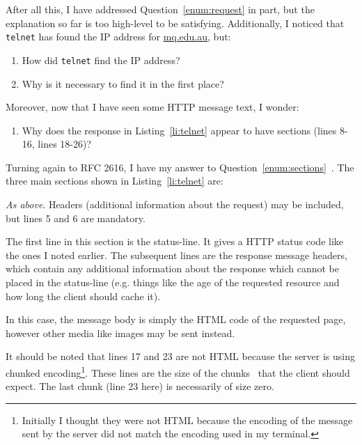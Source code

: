\documentclass[11pt,a4paper]{report}
\newcommand{\Q}[2]{
	\label{#2}
	\marginpar{\textbf{Q#1.\begin{NoHyper}\ref{#2}\end{NoHyper} }}
}
\newcounter{saveenumi}
\newcommand{\savei}{\setcounter{saveenumi}{\value{enumi}}}
\newcommand{\loadi}{\setcounter{enumi}{\value{saveenumi}}}
\begin{document}
	After all this, I have addressed Question~\ref{enum:request} in part, but the explanation so far is too high-level to be satisfying. Additionally, I noticed that \verb|telnet| has found the IP address for \url{mq.edu.au}, but:
	\begin{enumerate}
		\loadi
		\item How did \verb|telnet| find the IP address? \Q{2}{enum:howfindip}
		\item Why is it necessary to find it in the first place? \Q{2}{enum:whyfindip}
		\savei
	\end{enumerate}
	Moreover, now that I have seen some HTTP message text, I wonder:
	\begin{enumerate}
		\loadi
		\item Why does the response in Listing~\ref{li:telnet} appear to have sections (lines 8-16, lines 18-26)? \Q{2}{enum:sections}
		\savei
	\end{enumerate}
	
	Turning again to RFC 2616, I have my answer to Question~\ref{enum:sections}~\cite[Section~4]{http-rfc}. The three main sections shown in Listing~\ref{li:telnet} are:

	\begin{description}
		\setlength{}
		\item[Request {\rm (lines 5-7)}] \textit{As above}. Headers (additional information about the request) may be included, but lines 5 and 6 are mandatory.
		\item[Status-line {\rm and} response message headers {\rm (lines 8-16)}] The first line in this section is the status-line. It gives a HTTP status code like the ones I noted earlier. The subsequent lines are the response message headers, which contain any additional information about the response which cannot be placed in the status-line (e.g. things like the age of the requested resource and how long the client should cache it).
		\item[Response message body {\rm (lines 17-26)}] In this case, the message body is simply the HTML code of the requested page, however other media like images may be sent instead.
	\end{description}
	
	It should be noted that lines 17 and 23 are not HTML because the server is using chunked encoding\footnote{Initially I thought they were not HTML because the encoding of the message sent by the server did not match the encoding used in my terminal.}. These lines are the size of the chunks~\cite[Section~3.6.1]{http-rfc} that the client should expect. The last chunk (line 23 here) is necessarily of size zero.
	
\end{document}
